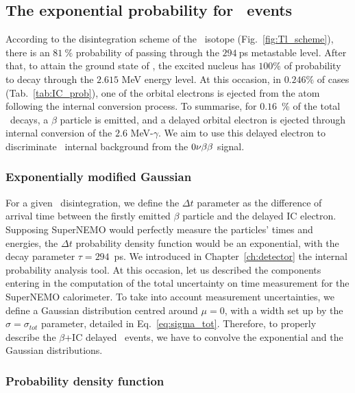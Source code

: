 \subsection{The exponential probability for \Tl\ events}

According to the disintegration scheme of the \Tl\ isotope (Fig.~\ref{fig:Tl_scheme}), there is an $81~\%$ probability of passing through the $294~$ps metastable level.
After that, to attain the ground state of \Pb, the excited nucleus has $100\%$ of probability to decay through the $2.615$ MeV energy level.
At this occasion, in $0.246\%$ of cases (Tab.~\ref{tab:IC_prob}), one of the orbital electrons is ejected from the atom following the internal conversion process.
To summarise, for $0.16$~\% of the total \Tl\ decays, a $\beta$ particle is emitted, and a delayed orbital electron is ejected through internal conversion of the $2.6$ MeV-$\gamma$.
We aim to use this delayed electron to discriminate \Tl\ internal background from the $0\nu\beta\beta$ signal.

\subsubsection{Exponentially modified Gaussian}

For a given \Tl\ disintegration, we define the $\Delta t$ parameter as the difference of arrival time between the firstly emitted $\beta$ particle and the delayed IC electron.
Supposing SuperNEMO would perfectly measure the particles' times and energies, the $\Delta t$ probability density function would be an exponential, with the decay parameter $\tau=294$~ps.
We introduced in Chapter~\ref{ch:detector} the internal probability analysis tool.
At this occasion, let us described the components entering in the computation of the total uncertainty on time measurement for the SuperNEMO calorimeter.
To take into account measurement uncertainties, we define a Gaussian distribution centred around $\mu=0$, with a width set up by the $\sigma=\sigma_{tot}$ parameter, detailed in Eq.~\eqref{eq:sigma_tot}.
Therefore, to properly describe the $\beta$+IC delayed \Tl\ events, we have to convolve the exponential and the Gaussian distributions.

\subsubsection{Probability density function}


